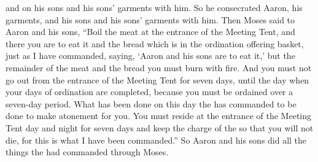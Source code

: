 {and on
his sons
and his sons’
garments
with
him. So he consecrated
Aaron,
his garments,
and his sons
and his sons’
garments
with him.
Then Moses
said to
Aaron
and his sons,
“Boil
the
meat
at the entrance
of the Meeting
Tent,
and there
you are to eat
it and the
bread
which
is in the ordination
offering basket,
just
as I have commanded,
saying,
‘Aaron
and his sons
are to eat it,’
but the remainder
of the meat
and the bread
you must burn
with fire.
And you must not
go out
from the entrance
of the Meeting
Tent
for seven
days,
until
the day
when
your days
of ordination
are completed,
because
you must be ordained
over a seven-day
period.
What has been
done
on
this
day
the {}
has commanded
to be done
to make atonement for you.
You must reside
at the entrance
of the
Meeting
Tent
day
and night
for seven
days
and keep
the charge
of the {}
so that you will not
die,
for
this
is what I have been commanded.”
So Aaron
and his sons
did
all
the things
the {}
had
commanded
through
Moses.

}

